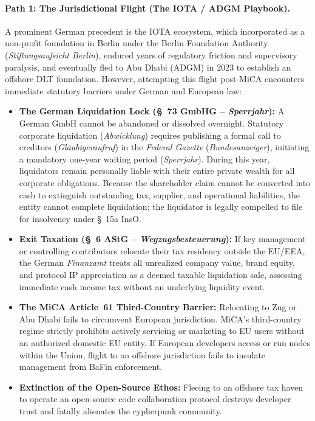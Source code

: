 \documentclass[a4paper,11pt,twoside,parskip=half-,headings=small]{scrartcl}
\begin{document}
\paragraph{Path 1: The Jurisdictional Flight (The IOTA / ADGM Playbook).}
A prominent German precedent is the IOTA ecosystem, which incorporated as a non-profit foundation in Berlin under the Berlin Foundation Authority (\emph{Stiftungsaufsicht Berlin}), endured years of regulatory friction and supervisory paralysis, and eventually fled to Abu Dhabi (ADGM) in 2023 to establish an offshore DLT foundation. However, attempting this flight post-MiCA encounters immediate statutory barriers under German and European law:
\begin{itemize}[nosep]
  \item \textbf{The German Liquidation Lock (\S~73 GmbHG -- \emph{Sperrjahr}):} A German GmbH cannot be abandoned or dissolved overnight. Statutory corporate liquidation (\emph{Abwicklung}) requires publishing a formal call to creditors (\emph{Gl{\"a}ubigeraufruf}) in the \emph{Federal Gazette} (\emph{Bundesanzeiger}), initiating a mandatory one-year waiting period (\emph{Sperrjahr}). During this year, liquidators remain personally liable with their entire private wealth for all corporate obligations. Because the  shareholder claim cannot be converted into cash to extinguish outstanding tax, supplier, and operational liabilities, the entity cannot complete liquidation; the liquidator is legally compelled to file for insolvency under \S~15a InsO.
  \item \textbf{Exit Taxation (\S~6 AStG -- \emph{Wegzugsbesteuerung}):} If key management or controlling contributors relocate their tax residency outside the EU/EEA, the German \emph{Finanzamt} treats all unrealized company value, brand equity, and protocol IP appreciation as a deemed taxable liquidation sale, assessing immediate cash income tax without an underlying liquidity event.
  \item \textbf{The MiCA Article~61 Third-Country Barrier:} Relocating to Zug or Abu Dhabi fails to circumvent European jurisdiction. MiCA's third-country regime strictly prohibits actively servicing or marketing to EU users without an authorized domestic EU entity. If European developers access  or run nodes within the Union, flight to an offshore jurisdiction fails to insulate management from BaFin enforcement.
  \item \textbf{Extinction of the Open-Source Ethos:} Fleeing to an offshore tax haven to operate an open-source code collaboration protocol destroys developer trust and fatally alienates the cypherpunk community.
\end{itemize}
\end{document}
